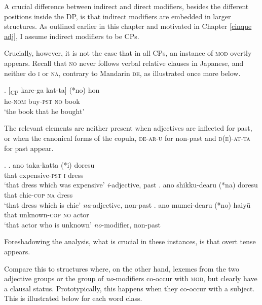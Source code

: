\documentclass [output=book,colorlinks,citecolor=brown]{langscibook}
\begin{document}
A crucial difference between indirect and direct modifiers, besides the different positions inside the DP, is that indirect modifiers are embedded in larger structures. As outlined earlier in this chapter and motivated in Chapter \ref{cinque adj}, I assume indirect modifiers to be CPs.

Crucially, however, it is not the case that in all CPs, an instance of \textsc{mod} overtly appears. Recall that \textsc{no} never follows verbal relative clauses in Japanese, and neither do \textsc{i} or \textsc{na}, contrary to Mandarin \textsc{de}, as illustrated once more below.

\exg. [\textsubscript{CP} kare-ga kat-ta] (*no) hon\\
{} he-\textsc{nom} buy-\textsc{pst} \textsc{no} book\\
`the book that he bought’

The relevant elements are neither present when adjectives are inflected for past, or when the canonical forms of the copula, \textsc{de-ar-u} for non-past and \textsc{d(e)-at-ta} for past appear.


\ex. \ag. ano taka-katta (*i) doresu\\
that expensive-\textsc{pst} \textsc{i} dress\\
`that dress which was expensive' \null \hfill \textit{i}-adjective, past
\bg. ano shikku-dearu (*na) doresu\\
that chic-\textsc{cop} \textsc{na} dress\\
`that dress which is chic’ \null \hfill \textit{na}-adjective, non-past
\cg. ano mumei-dearu (*no) haiyū\\
that unknown-\textsc{cop} \textsc{no} actor\\
`that actor who is unknown' \null \hfill \textit{no}-modifier, non-past

Foreshadowing the analysis, what is crucial in these instances, is that overt tense appears.

Compare this to structures where, on the other hand, lexemes from the two adjective groups or the group of \textit{no}-modifiers co-occur with \textsc{mod}, but clearly have a clausal status. Prototypically, this happens when they co-occur with a subject. This is illustrated below for each word class.
\end{document}
